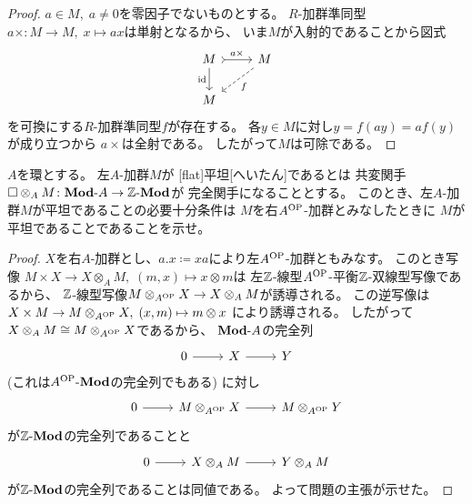 \documentclass[report]{jlreq}
\begin{document}
\begin{proof}
    $a \in M, \; a \neq 0$を零因子でないものとする。
    $R$-加群準同型$a \times \colon M \to M, \; x \mapsto ax$は単射となるから、
    いま$M$が入射的であることから図式
    \begin{equation}
        \begin{tikzcd}
            M \ar[tail]{r}{a \times} \ar{d}[swap]{\id}
                & M \ar[dashed]{ld}{f} \\
            M
        \end{tikzcd}
    \end{equation}
    を可換にする$R$-加群準同型$f$が存在する。
    各$y \in M$に対し$y = f(ay) = af(y)$が成り立つから
    $a \times$は全射である。
    したがって$M$は可除である。
\end{proof}

\begin{problem}[代数学II 9.117]
    $A$を環とする。
    左$A$-加群$M$が
    [flat]{平坦}[へいたん]であるとは
    共変関手$\Box \otimes_A M \colon \mathbf{Mod}\text{-}A \to \mathbb{Z}\text{-}\mathbf{Mod}$が
    完全関手になることとする。
    このとき、左$A$-加群$M$が平坦であることの必要十分条件は
    $M$を右$A^{\mathrm{OP}}$-加群とみなしたときに
    $M$が平坦であることであることを示せ。
\end{problem}

\begin{proof}
    $X$を右$A$-加群とし、$a.x \coloneqq xa$により左$A^{\mathrm{OP}}$-加群ともみなす。
    このとき写像
    $M \times X \to X \otimes_A M, \; (m, x) \mapsto x \otimes m$は
    左$\mathbb{Z}$-線型$A^{\mathrm{OP}}$-平衡$\mathbb{Z}$-双線型写像であるから、
    $\mathbb{Z}$-線型写像$M \otimes_{A^{\mathrm{OP}}} X \to X \otimes_A M$が誘導される。
    この逆写像は
    $X \times M \to M \otimes_{A^{\mathrm{OP}}} X, \; (x, m) \mapsto m \otimes x$
    により誘導される。
    したがって$X \otimes_A M \cong M \otimes_{A^{\mathrm{OP}}} X$であるから、
    $\mathbf{Mod}\text{-}A$の完全列
    \begin{equation}
        \begin{tikzcd}
            0
                \ar{r}
                & X
                    \ar{r}
                & Y
        \end{tikzcd}
    \end{equation}
    (これは$A^{\mathrm{OP}}\text{-}\mathbf{Mod}$の完全列でもある) に対し
    \begin{equation}
        \begin{tikzcd}
            0
                \ar{r}
                & M \otimes_{A^\OP} X
                    \ar{r}
                & M \otimes_{A^\OP} Y
        \end{tikzcd}
    \end{equation}
    が$\mathbb{Z}\text{-}\mathbf{Mod}$の完全列であることと
    \begin{equation}
        \begin{tikzcd}
            0
                \ar{r}
                & X \otimes_A M
                    \ar{r}
                & Y \otimes_A M
        \end{tikzcd}
    \end{equation}
    が$\mathbb{Z}\text{-}\mathbf{Mod}$の完全列であることは同値である。
    よって問題の主張が示せた。
\end{proof}
\end{document}
